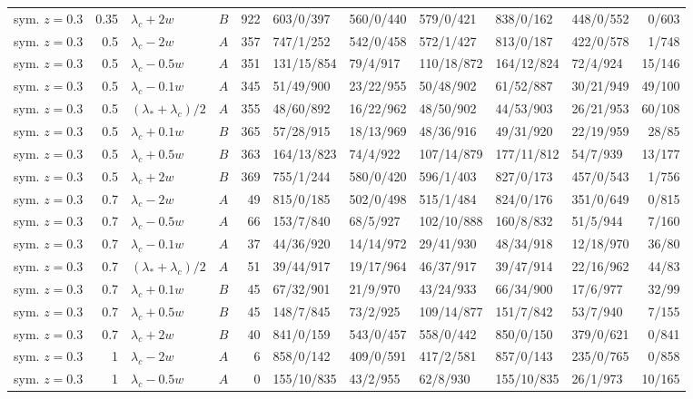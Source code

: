 \begin{longtable}{@{}lrllrlllllr@{}}
sym. $z{=}0.3$ & 0.35 & $\lambda_c+2w$ & $B$ & 922 & 603/0/397 & 560/0/440 & 579/0/421 & 838/0/162 & 448/0/552 & 0/603\\
sym. $z{=}0.3$ & 0.5 & $\lambda_c-2w$ & $A$ & 357 & 747/1/252 & 542/0/458 & 572/1/427 & 813/0/187 & 422/0/578 & 1/748\\
sym. $z{=}0.3$ & 0.5 & $\lambda_c-0.5w$ & $A$ & 351 & 131/15/854 & 79/4/917 & 110/18/872 & 164/12/824 & 72/4/924 & 15/146\\
sym. $z{=}0.3$ & 0.5 & $\lambda_c-0.1w$ & $A$ & 345 & 51/49/900 & 23/22/955 & 50/48/902 & 61/52/887 & 30/21/949 & 49/100\\
sym. $z{=}0.3$ & 0.5 & $(\lambda_*+\lambda_c)/2$ & $A$ & 355 & 48/60/892 & 16/22/962 & 48/50/902 & 44/53/903 & 26/21/953 & 60/108\\
sym. $z{=}0.3$ & 0.5 & $\lambda_c+0.1w$ & $B$ & 365 & 57/28/915 & 18/13/969 & 48/36/916 & 49/31/920 & 22/19/959 & 28/85\\
sym. $z{=}0.3$ & 0.5 & $\lambda_c+0.5w$ & $B$ & 363 & 164/13/823 & 74/4/922 & 107/14/879 & 177/11/812 & 54/7/939 & 13/177\\
sym. $z{=}0.3$ & 0.5 & $\lambda_c+2w$ & $B$ & 369 & 755/1/244 & 580/0/420 & 596/1/403 & 827/0/173 & 457/0/543 & 1/756\\
sym. $z{=}0.3$ & 0.7 & $\lambda_c-2w$ & $A$ & 49 & 815/0/185 & 502/0/498 & 515/1/484 & 824/0/176 & 351/0/649 & 0/815\\
sym. $z{=}0.3$ & 0.7 & $\lambda_c-0.5w$ & $A$ & 66 & 153/7/840 & 68/5/927 & 102/10/888 & 160/8/832 & 51/5/944 & 7/160\\
sym. $z{=}0.3$ & 0.7 & $\lambda_c-0.1w$ & $A$ & 37 & 44/36/920 & 14/14/972 & 29/41/930 & 48/34/918 & 12/18/970 & 36/80\\
sym. $z{=}0.3$ & 0.7 & $(\lambda_*+\lambda_c)/2$ & $A$ & 51 & 39/44/917 & 19/17/964 & 46/37/917 & 39/47/914 & 22/16/962 & 44/83\\
sym. $z{=}0.3$ & 0.7 & $\lambda_c+0.1w$ & $B$ & 45 & 67/32/901 & 21/9/970 & 43/24/933 & 66/34/900 & 17/6/977 & 32/99\\
sym. $z{=}0.3$ & 0.7 & $\lambda_c+0.5w$ & $B$ & 45 & 148/7/845 & 73/2/925 & 109/14/877 & 151/7/842 & 53/7/940 & 7/155\\
sym. $z{=}0.3$ & 0.7 & $\lambda_c+2w$ & $B$ & 40 & 841/0/159 & 543/0/457 & 558/0/442 & 850/0/150 & 379/0/621 & 0/841\\
sym. $z{=}0.3$ & 1 & $\lambda_c-2w$ & $A$ & 6 & 858/0/142 & 409/0/591 & 417/2/581 & 857/0/143 & 235/0/765 & 0/858\\
sym. $z{=}0.3$ & 1 & $\lambda_c-0.5w$ & $A$ & 0 & 155/10/835 & 43/2/955 & 62/8/930 & 155/10/835 & 26/1/973 & 10/165\\

\end{longtable}
